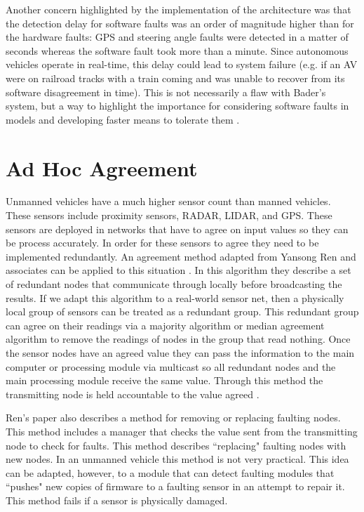 \documentclass[twoside, conference]{IEEEtran}
\begin{document}
Another concern highlighted by the implementation of the architecture was that the detection delay for software faults was an order of magnitude higher than for the hardware faults: GPS and steering angle faults were detected in a matter of seconds whereas the software fault took more than a minute. Since autonomous vehicles operate in real-time, this delay could lead to system failure (e.g. if an AV were on railroad tracks with a train coming and was unable to recover from its software disagreement in time). This is not necessarily a flaw with Bader's system, but a way to highlight the importance for considering software faults in models and developing faster means to tolerate them \cite{Bader2014}.	
	
\section{Ad Hoc Agreement}\label{sec:adhoc-agreement}
Unmanned vehicles have a much higher sensor count than manned vehicles. These sensors include proximity sensors, RADAR, LIDAR, and GPS. These sensors are deployed in networks that have to agree on input values so they can be process accurately. In order for these sensors to agree they need to be implemented redundantly. An agreement method adapted from Yansong Ren and associates can be applied to this situation \cite{Ren2001}. In this algorithm they describe a set of redundant nodes that communicate through locally before broadcasting the results. If we adapt this algorithm to a real-world sensor net, then a physically local group of sensors can be treated as a redundant group. This redundant group can agree on their readings via a majority algorithm or median agreement algorithm to remove the readings of nodes in the group that read nothing. Once the sensor nodes have an agreed value they can pass the information to the main computer or processing module via multicast so all redundant nodes and the main processing module receive the same value. Through this method the transmitting node is held accountable to the value agreed \cite{Ren2001}.

Ren's paper also describes a method for removing or replacing faulting nodes. This method includes a manager that checks the value sent from the transmitting node to check for faults. This method describes ``replacing" faulting nodes with new nodes. In an unmanned vehicle this method is not very practical. This idea can be adapted, however, to a module that can detect faulting modules that ``pushes" new copies of firmware to a faulting sensor in an attempt to repair it. This method fails if a sensor is physically damaged.\cite{Ren2001}
\end{document}
